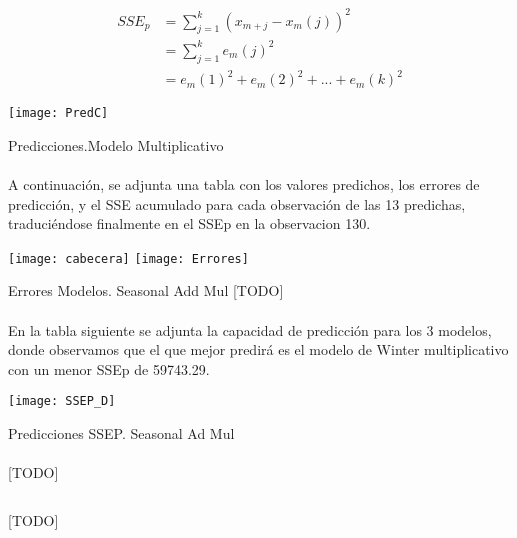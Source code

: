 \documentclass[a4paper, spanish]{article}
\begin{document}
    \begin{equation}
    \label{eq:sse_p}
      \begin{split}
        SSE_p
        &= \sum_{j = 1} ^ k (x_{m + j} - x_{m}(j)) ^ 2 \\
        &= \sum_{j = 1} ^ k e_m(j) ^ 2 \\
        &= e_m(1) ^ 2 + e_m(2) ^ 2 + ... + e_m(k) ^ 2
      \end{split}
    \end{equation}

    \begin{table}[htb!]
      \centering
      \texttt{[image: PredC]}
      \caption{Predicciones.Modelo Multiplicativo}
      \label{}
    \end{table}

    \paragraph{}
    A continuación, se adjunta una tabla con los valores predichos, los errores de predicción, y el SSE acumulado para cada observación de las 13 predichas, traduciéndose finalmente en el SSEp en la observacion 130.

    \begin{table}[htb!]
      \centering
      \texttt{[image: cabecera]}
      \texttt{[image: Errores]}
      \caption{Errores Modelos. Seasonal Add Mul [TODO]}
      \label{}
    \end{table}

    \paragraph{}
    En la tabla siguiente se adjunta la capacidad de predicción para los 3 modelos, donde observamos que el que mejor predirá
    es el modelo de Winter multiplicativo con un menor SSEp de 59743.29.

    \begin{table}[htb!]
      \centering
      \texttt{[image: SSEP\_D]}
      \caption{Predicciones SSEP. Seasonal Ad Mul}
      \label{}
    \end{table}

    \paragraph{}
    [TODO]

    \begin{listing}[htb!]
      \centering
      \inputminted{SAS}{./res/code/d-01-cross-validation.sas}
      \caption{[TODO]}
      \label{code:d_cross_validation}
    \end{listing}
\end{document}
